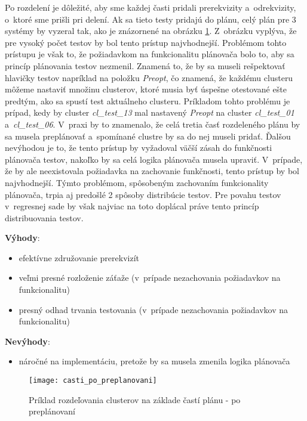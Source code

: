 Po rozdelení je dôležité, aby sme každej časti pridali prerekvizity 
a~odrekvizity, o~ktoré sme prišli pri delení. Ak sa tieto testy pridajú 
do plánu, celý plán pre 3 systémy by vyzeral tak, ako je znázornené na 
obrázku \ref{obrazok:distribucia_casti_po_preplanovani}.
Z~obrázku vyplýva, že pre vysoký počet testov by bol tento prístup 
najvhodnejší. Problémom tohto prístupu je však to, že požiadavkom na 
funkcionalitu plánovača bolo to, aby sa princíp plánovania testov nezmenil. 
Znamená to, že by sa museli rešpektovať hlavičky testov napríklad na 
položku \emph{Preopt}, čo znamená, že každému clusteru môžeme nastaviť 
množinu clusterov, ktoré musia byť úspešne otestované ešte predtým, 
ako sa spustí test aktuálneho clusteru.
Príkladom tohto problému je prípad, kedy by cluster \emph{cl\_test\_13} 
mal nastavený \textit{Preopt} na cluster \emph{cl\_test\_01} 
a~\emph{cl\_test\_06}.
V~praxi by to znamenalo, že celá tretia časť rozdeleného plánu by sa 
musela preplánovať a~spomínané clustre by sa do nej museli pridať. 
Ďalšou nevýhodou je to, že tento prístup by vyžadoval väčší zásah do 
funkčnosti plánovača testov, nakoľko by sa celá logika plánovača musela upraviť.
V~prípade, že by ale neexistovala požiadavka na zachovanie funkčnosti, 
tento prístup by bol najvhodnejší. Týmto problémom, spôsobeným zachovaním 
funkcionality plánovača, trpia aj predošlé 2 spôsoby distribúcie testov. 
Pre povahu testov v~regresnej sade by však najviac na toto doplácal 
práve tento princíp distribuovania testov.  

\noindent \textbf{Výhody}:
\begin{itemize}
\item efektívne združovanie prerekvizít
\item veľmi presné rozloženie záťaže 
(v~prípade nezachovania požiadavkov na funkcionalitu)
\item presný odhad trvania testovania 
(v~prípade nezachovania požiadavkov na funkcionalitu)
\end{itemize} 

\noindent \textbf{Nevýhody}:
\begin{itemize}
\item náročné na implementáciu, pretože by sa musela zmenila logika plánovača
\end{itemize}

\begin{figure}[h]
  \begin{center}
    \texttt{[image: casti\_po\_preplanovani]}
    \caption{Príklad rozdeľovania clusterov na základe častí plánu
             - po preplánovaní}
    \label{obrazok:distribucia_casti_po_preplanovani}
  \end{center}
\end{figure}

